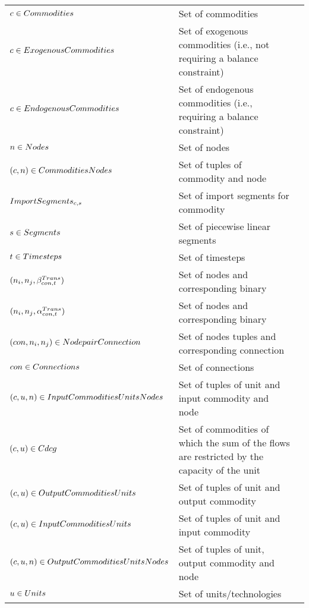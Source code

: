 	\begin{longtable}{p{\cola} p{\colc} >{\small\raggedleft\arraybackslash\itshape}p{\colb}}
		$c \in Commodities   $	& Set of commodities                                          	&                \\
		$c \in ExogenousCommodities$	& Set of exogenous commodities (i.e., not requiring a balance constraint)	&                \\
		$c \in EndogenousCommodities$	& Set of endogenous commodities (i.e., requiring a balance constraint)	&                \\
		$n \in Nodes         $	& Set of nodes                                                	&                \\
		$(c, n) \in CommoditiesNodes$	& Set of tuples of commodity and node                         	&                \\
		$ImportSegments_{c,s}$	& Set of import segments \segment for commodity \commodity    	&                \\
		$s \in Segments      $	& Set of piecewise linear segments                            	&                \\
		$t \in Timesteps     $	& Set of timesteps                                            	&                \\
		$(n_i,n_j,\beta^{Trans}_{{con},t})       $	& Set of nodes and corresponding binary                       	&                \\
		$(n_i,n_j,\alpha^{Trans}_{{con},t})      $	& Set of nodes and corresponding binary                       	&                \\
		$({con},n_i,n_j) \in NodepairConnection$	& Set of nodes tuples and corresponding connection            	&                \\
		${con} \in Connections   $	& Set of connections                                          	&                \\
		$(c, u, n) \in InputCommoditiesUnitsNodes$	& Set of tuples of unit and input commodity and node          	&                \\
		$(c, u) \in Cdcg          $	& Set of commodities of which the sum of the flows are restricted by the capacity of the unit	&                \\
		$(c, u) \in OutputCommoditiesUnits$	& Set of tuples of unit and output commodity                  	&                \\
		$(c, u) \in InputCommoditiesUnits$	& Set of tuples of unit and input commodity                   	&                \\
		$(c, u, n) \in OutputCommoditiesUnitsNodes$	& Set of tuples of unit, output commodity and node            	&                \\
		$u \in Units         $	& Set of units/technologies                                   	&                \\
	\end{longtable}

